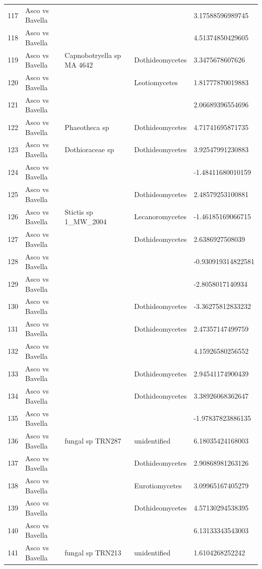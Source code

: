\documentclass[12pt]{article}\usepackage[]{graphicx}\usepackage[]{color}
\numberwithin{figure}{section}
\begin{document}
\begin{table}[ht]
\begin{tabular}{lllll}
  117 & Asco vs Bavella &  &  & 3.17588596989745 \\ 
  118 & Asco vs Bavella &  &  & 4.51374850429605 \\ 
  119 & Asco vs Bavella & Capnobotryella sp MA 4642 & Dothideomycetes & 3.3475678607626 \\ 
  120 & Asco vs Bavella &  & Leotiomycetes & 1.81777870019883 \\ 
  121 & Asco vs Bavella &  &  & 2.06689396554696 \\ 
  122 & Asco vs Bavella & Phaeotheca sp & Dothideomycetes & 4.71741695871735 \\ 
  123 & Asco vs Bavella & Dothioraceae sp & Dothideomycetes & 3.92547991230883 \\ 
  124 & Asco vs Bavella &  &  & -1.48411680010159 \\ 
  125 & Asco vs Bavella &  & Dothideomycetes & 2.48579253100881 \\ 
  126 & Asco vs Bavella & Stictis sp 1\_MW\_2004 & Lecanoromycetes & -1.46185169066715 \\ 
  127 & Asco vs Bavella &  & Dothideomycetes & 2.6386927508039 \\ 
  128 & Asco vs Bavella &  &  & -0.930919314822581 \\ 
  129 & Asco vs Bavella &  &  & -2.8058017140934 \\ 
  130 & Asco vs Bavella &  & Dothideomycetes & -3.36275812833232 \\ 
  131 & Asco vs Bavella &  & Dothideomycetes & 2.47357147499759 \\ 
  132 & Asco vs Bavella &  &  & 4.15926580256552 \\ 
  133 & Asco vs Bavella &  & Dothideomycetes & 2.94541174900439 \\ 
  134 & Asco vs Bavella &  & Dothideomycetes & 3.38926068362647 \\ 
  135 & Asco vs Bavella &  &  & -1.97837823886135 \\ 
  136 & Asco vs Bavella & fungal sp TRN287 & unidentified & 6.18035424168003 \\ 
  137 & Asco vs Bavella &  & Dothideomycetes & 2.90868981263126 \\ 
  138 & Asco vs Bavella &  & Eurotiomycetes & 3.09965167405279 \\ 
  139 & Asco vs Bavella &  & Dothideomycetes & 4.57130294538395 \\ 
  140 & Asco vs Bavella &  &  & 6.13133343543003 \\ 
  141 & Asco vs Bavella & fungal sp TRN213 & unidentified & 1.6104268252242 \\ 

\end{tabular}
\end{table}
\end{document}
